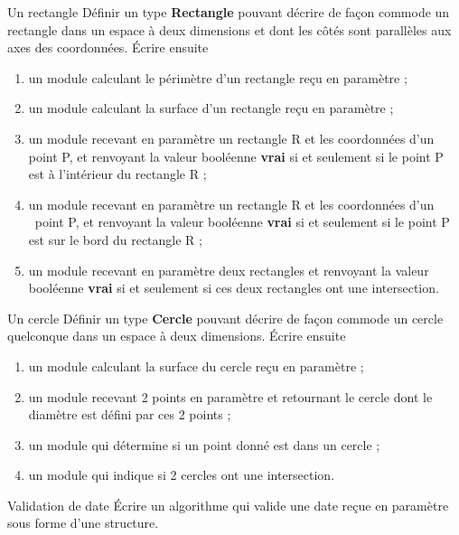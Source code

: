 \begin{Exercice}{Un rectangle}
	Définir un type \textbf{Rectangle} pouvant décrire de façon
	commode un rectangle dans un espace à deux dimensions et dont les côtés
	sont parallèles aux axes des coordonnées. 
	Écrire ensuite

	\begin{enumerate}[label=\alph*)]
	\item {
		un module calculant le périmètre d’un rectangle reçu en paramètre ;}
	\item {
		un module calculant la surface d’un rectangle reçu en paramètre ;}
	\item {
		un module recevant en paramètre un rectangle R et les coordonnées
		d'un point P, et renvoyant la valeur booléenne
		\textbf{vrai} si et seulement si le point P est à
		l'intérieur du rectangle R ;}
	\item {
		un module recevant en paramètre un rectangle R et les coordonnées
		d'un \ point P, et renvoyant la valeur booléenne
		\textbf{vrai} si et seulement si le point P est sur le bord du
		rectangle R ;}
	\item {
		un module recevant en paramètre deux rectangles et renvoyant la valeur
		booléenne \textbf{vrai} si et seulement si ces deux rectangles ont une
		intersection.}
	\end{enumerate}
\end{Exercice}

\begin{Exercice}{Un cercle}
	Définir un type \textbf{Cercle} pouvant décrire de façon
	commode un cercle quelconque dans un espace à deux dimensions. 
	Écrire ensuite
	
	\begin{enumerate}[label=\alph*)]
	\item {
		un module calculant la surface du cercle reçu en paramètre ;}
	\item {
		un module recevant 2 points en paramètre et retournant le cercle dont le
		diamètre est défini par ces 2 points ;}
	\item {
		un module qui détermine si un point donné est dans un cercle ;}
	\item {
		un module qui indique si 2 cercles ont une intersection.
	}
	\end{enumerate}
\end{Exercice}

\begin{Exercice}{Validation de date}
	Écrire un algorithme qui valide une date reçue en paramètre 
	sous forme d'une structure.
\end{Exercice}

	
